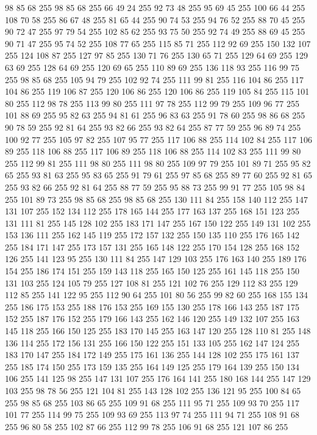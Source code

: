 98 85 68 255 98 85 68 255 66 49 24 255 92 73 48 255 95 69 45 255 100 66 44 255 108 70 58 255 86 67 48 255 81 65 44 255 90 74 53 255 94 76 52 255 88 70 45 255 90 72 47 255 97 79 54 255 102 85 62 255 93 75 50 255 92 74 49 255 88 69 45 255 90 71 47 255 95 74 52 255 108 77 65 255 115 85 71 255 112 92 69 255 150 132 107 255 124 108 87 255 127 97 85 255 130 71 76 255 130 65 71 255 129 64 69 255 129 63 69 255 128 64 69 255 120 69 65 255 110 89 69 255 136 118 93 255 116 99 75 255 98 85 68 255 105 94 79 255 102 92 74 255 111 99 81 255 116 104 86 255 117 104 86 255 119 106 87 255 120 106 86 255 120 106 86 255 119 105 84 255 115 101 80 255 112 98 78 255 113 99 80 255 111 97 78 255 112 99 79 255 109 96 77 255 101 88 69 255 95 82 63 255 94 81 61 255 96 83 63 255 91 78 60 255 98 86 68 255 90 78 59 255 92 81 64 255 93 82 66 255 93 82 64 255 87 77 59 255 96 89 74 255 100 92 77 255
105 97 82 255 107 95 77 255 117 106 88 255 114 102 84 255 117 106 89 255 118 106 88 255 117 106 89 255 118 106 88 255 114 102 83 255 111 99 80 255 112 99 81 255 111 98 80 255 111 98 80 255 109 97 79 255 101 89 71 255 95 82 65 255 93 81 63 255 95 83 65 255 91 79 61 255 97 85 68 255 89 77 60 255 92 81 65 255 93 82 66 255 92 81 64 255 88 77 59 255 95 88 73 255 99 91 77 255 105 98 84 255 101 89 73 255 98 85 68 255 98 85 68 255 130 111 84 255 158 140 112 255 147 131 107 255 152 134 112 255 178 165 144 255 177 163 137 255 168 151 123 255 131 111 81 255 145 128 102 255 183 171 147 255 167 150 122 255 149 131 102 255 153 136 111 255 162 145 119 255 172 157 132 255 150 135 110 255 176 165 142 255 184 171 147 255 173 157 131 255 165 148 122 255 170 154 128 255 168 152 126 255 141 123 95 255 130 111 84 255 147 129 103 255 176 163 140 255 189 176 154 255 186 174 151 255 159 143 118 255 165 150 125 255 161 145 118 255 150 131 103 255 124 105 79 255
127 108 81 255 121 102 76 255 129 112 83 255 129 112 85 255 141 122 95 255 112 90 64 255 101 80 56 255 99 82 60 255 168 155 134 255 186 175 153 255 188 176 153 255 169 155 130 255 178 166 143 255 187 175 152 255 187 176 152 255 179 166 143 255 162 146 120 255 149 132 107 255 163 145 118 255 166 150 125 255 183 170 145 255 163 147 120 255 128 110 81 255 148 136 114 255 172 156 131 255 166 150 122 255 151 133 105 255 162 147 124 255 183 170 147 255 184 172 149 255 175 161 136 255 144 128 102 255 175 161 137 255 185 174 150 255 173 159 135 255 164 149 125 255 179 164 139 255 150 134 106 255 141 125 98 255 147 131 107 255 176 164 141 255 180 168 144 255 147 129 103 255 98 78 56 255 121 104 81 255 143 128 102 255 136 121 95 255 100 84 65 255 98 85 68 255 103 86 65 255 109 91 68 255 111 95 71 255 109 93 70 255 117 101 77 255 114 99 75 255 109 93 69 255 113 97 74 255 111 94 71 255 108 91 68 255 96 80 58 255 102 87 66 255 112 99 78 255 106 91 68 255 121 107 86 255
